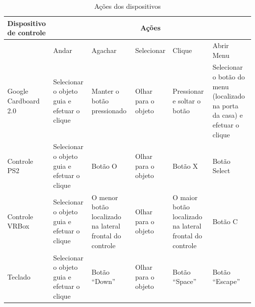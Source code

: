 \begin{longtable}{p{2.2cm}|p{2.2cm}|p{2.2cm}|p{2.2cm}|p{2.2cm}|p{2.2cm}}
	\caption[]{Ações dos dispositivos}  \\
	\label{t.acoes}
	\textbf{\small Dispositivo de controle} & \multicolumn{5}{c}{\textbf{\small Ações}}  \\ \hline \hline
	{} & {\small Andar} & {\small Agachar}  & {\small Selecionar} & {\small Clique}  & {\small Abrir Menu}\\\hline \hline
	{\small Google Cardboard 2.0} & {\small Selecionar o objeto guia e efetuar o clique} & {\small Manter o botão pressionado} &{\small Olhar para o objeto} & {\small Pressionar e soltar o botão} & {\small Selecionar o botão do menu (localizado na porta da casa) e efetuar o clique}\\\hline		 
	{\small Controle PS2} & {\small Selecionar o objeto guia e efetuar o clique} & {\small Botão O} &{\small Olhar para o objeto} & {\small Botão X} & {\small Botão Select}\\\hline		 
	{\small Controle VRBox} & {\small Selecionar o objeto guia e efetuar o clique} & {\small O menor botão localizado na lateral frontal do controle} &{\small Olhar para o objeto} & {\small O maior botão localizado na lateral frontal do controle} & {\small Botão C}\\\hline  		 
	{\small Teclado} & {\small Selecionar o objeto guia e efetuar o clique} & {\small Botão “Down”} &{\small Olhar para o objeto} & {\small Botão “Space”} & {\small Botão “Escape”} 	\\\hline	
\end{longtable}



